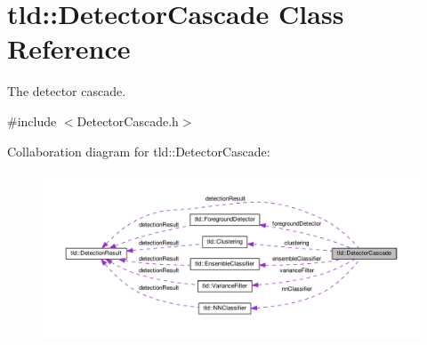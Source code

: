\hypertarget{classtld_1_1DetectorCascade}{\section{tld\-:\-:Detector\-Cascade Class Reference}
\label{classtld_1_1DetectorCascade}
}


The detector cascade.  




{\ttfamily \#include $<$Detector\-Cascade.\-h$>$}



Collaboration diagram for tld\-:\-:Detector\-Cascade\-:\nopagebreak
\begin{figure}[H]
\begin{center}
\leavevmode
\includegraphics[width=350pt]{classtld_1_1DetectorCascade__coll__graph}
\end{center}
\end{figure}
